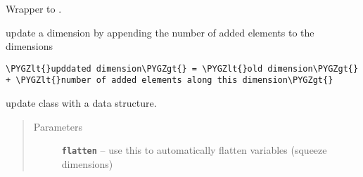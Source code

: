 \documentclass[letterpaper,10pt,english]{sphinxmanual}
\def\PYGZlt{\char`\<}
\def\PYGZgt{\char`\>}
\begin{document}
\begin{fulllineitems}
\begin{fulllineitems}
\end{fulllineitems}


\begin{fulllineitems}
\label{altimetry.data:altimetry.data.hydro_data.update}
Wrapper to {\hyperref[altimetry.data:altimetry.data.hydro_data.update_with_slice]{\emph{}}}.

\end{fulllineitems}


\begin{fulllineitems}
\label{altimetry.data:altimetry.data.hydro_data.update_Dim}
update a dimension by appending the number of added elements to the dimensions

\begin{Verbatim}[commandchars=\\\{\}]
\PYGZlt{}upddated dimension\PYGZgt{} = \PYGZlt{}old dimension\PYGZgt{} + \PYGZlt{}number of added elements along this dimension\PYGZgt{}
\end{Verbatim}

\end{fulllineitems}


\begin{fulllineitems}
\label{altimetry.data:altimetry.data.hydro_data.update_dataset}
update class with a data structure.
\begin{quote}\begin{description}
\item[{Parameters}] \leavevmode
\textbf{\texttt{flatten}} -- use this to automatically flatten variables (squeeze dimensions)

\end{description}\end{quote}

\end{fulllineitems}



\end{fulllineitems}
\end{document}
